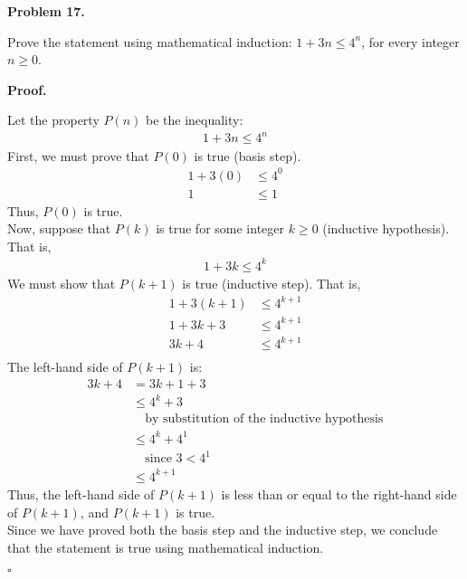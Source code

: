\documentclass{article}
\newenvironment{problem}[1]{
    \begin{mdframed}[backgroundcolor=gray!20, skipabove=\baselineskip, skipbelow=\baselineskip, nobreak=true, innerleftmargin=10pt, innerrightmargin=10pt, innertopmargin=10pt, innerbottommargin=10pt]
    \textbf{Problem #1.}
}{
    \end{mdframed}
}
\newenvironment{proof}{
    \begin{mdframed}[nobreak=false, innerleftmargin=10pt, innerrightmargin=10pt, innertopmargin=10pt, innerbottommargin=10pt]
    \textbf{Proof.}
}{
    \hfill $\square$
    \end{mdframed}
}
\begin{document}
    \begin{problem}{17}
        Prove the statement using mathematical induction: $1 + 3n \leq 4^n$, for every integer $n \geq 0$.
    \end{problem}
    \begin{proof}
        Let the property $P(n)$ be the inequality:
        \begin{align*}
            1 + 3n \leq 4^n
        \end{align*}
        First, we must prove that $P(0)$ is true (basis step).
        \begin{align*}
            1 + 3(0) &\leq 4^0 \\
            1 &\leq 1
        \end{align*}
        Thus, $P(0)$ is true. \\
        Now, suppose that $P(k)$ is true for some integer $k \geq 0$ (inductive hypothesis). That is,
        \begin{align*}
            1 + 3k \leq 4^k
        \end{align*}
        We must show that $P(k+1)$ is true (inductive step). That is,
        \begin{align*}
            1 + 3(k+1) &\leq 4^{k+1} \\
            1 + 3k+3 &\leq 4^{k+1} \\
            3k+4 &\leq 4^{k+1} \\
        \end{align*}
        The left-hand side of $P(k+1)$ is:
        \begin{align*}
            3k+4 &= 3k+1+3 \\
            &\leq 4^k + 3 \\
            & \quad \text{by substitution of the inductive hypothesis} \\
            &\leq 4^k + 4^1 \\
            & \quad \text{since $3 < 4^1$} \\
            &\leq 4^{k+1}
        \end{align*}
        Thus, the left-hand side of $P(k+1)$ is less than or equal to the right-hand side of $P(k+1)$, and $P(k+1)$ is true. \\
        Since we have proved both the basis step and the inductive step, we conclude that the statement is true using mathematical induction.
    \end{proof}
\end{document}

